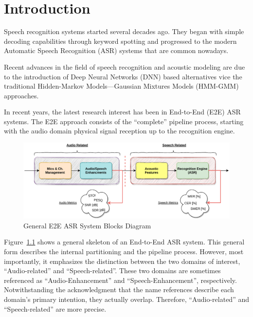 \chapter{Introduction}
Speech recognition systems
started several decades ago.
They began with simple decoding capabilities through keyword
spotting and progressed to the modern Automatic Speech Recognition (ASR) systems
that are common nowadays\cite{asrBriefHistory}.

Recent advances in the field of speech recognition and acoustic modeling are
due to the introduction of 
Deep Neural Networks (DNN) 
based alternatives vice the traditional
Hidden-Markov Models---Gaussian Mixtures Models (HMM-GMM) approaches\cite{7472778, 6296526}.

In recent years, the latest research 
interest has been in 
End-to-End (E2E) ASR systems\cite{boeddeker2018exploring}.
The E2E approach consists of the ``complete'' pipeline process, starting with
the audio domain physical signal reception up to the recognition engine.

\begin{figure}[H]
	\centering
	\includegraphics[width=\linewidth]{Introduction/images/asr_blocks}
	\caption{General E2E ASR System Blocks Diagram}\label{fig:asr_blocks_diagram}
\end{figure}
\vspace{-0.5cm}

Figure~\ref{fig:asr_blocks_diagram} shows 
a general skeleton of
an End-to-End ASR system. This general form describes the
internal partitioning and the pipeline process.
However, most importantly, it emphasizes
the distinction between the two domains of interest,
``Audio-related'' and ``Speech-related''.
These two domains are sometimes referenced
as ``Audio-Enhancement'' and ``Speech-Enhancement'', respectively.
Notwithstanding the acknowledgment that 
the name references describe each domain's 
primary intention, they actually overlap.
Therefore, ``Audio-related'' and ``Speech-related'' are more precise.

